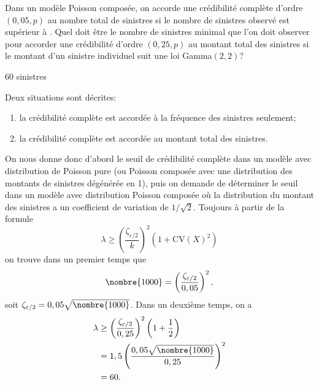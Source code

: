 \begin{exercice}
  Dans un modèle Poisson composée, on accorde une crédibilité complète
  d'ordre $(0,05, p)$ au nombre total de sinistres si le nombre de
  sinistres observé est supérieur à . Quel doit être le
  nombre de sinistres minimal que l'on doit observer pour accorder une
  crédibilité d'ordre $(0,25, p)$ au montant total des sinistres si le
  montant d'un sinistre individuel suit une loi Gamma$(2, 2)$?
  \begin{rep}
    60 sinistres
  \end{rep}
  \begin{sol}
    Deux situations sont décrites:
    \begin{enumerate}[1)]
    \item la crédibilité complète est accordée à la fréquence des
      sinistres seulement;
    \item la crédibilité complète est accordée au montant total des
      sinistres.
    \end{enumerate}
    On nous donne donc d'abord le seuil de crédibilité complète dans
    un modèle avec distribution de Poisson pure (ou Poisson composée
    avec une distribution des montants de sinistres dégénérée en 1),
    puis on demande de déterminer le seuil dans un modèle avec
    distribution Poisson composée où la distribution du montant des
    sinistres a un coefficient de variation de $1/\sqrt{2}$. Toujours
    à partir de la formule
    \begin{displaymath}
      \lambda \geq
      \left(
        \frac{\zeta_{\varepsilon/2}}{k}
      \right)^2
      (1 + \mathrm{CV}(X)^2)
    \end{displaymath}
    on trouve dans un premier temps que
    \begin{displaymath}
      \nombre{1000} =
      \left(
        \frac{\zeta_{\varepsilon/2}}{0,05}
      \right)^2,
    \end{displaymath}
    soit $\zeta_{\varepsilon/2} = 0,05 \sqrt{\nombre{1000}}$. Dans un
    deuxième temps, on a
    \begin{align*}
      \lambda
      &\geq
      \left(
        \frac{\zeta_{\varepsilon/2}}{0,25}
      \right)^2
      \left(
        1 + \frac{1}{2}
      \right) \\
      &= 1,5
      \left(
        \frac{0,05 \sqrt{\nombre{1000}}}{0,25}
      \right)^2 \\
      &= 60.
    \end{align*}
  \end{sol}
\end{exercice}

